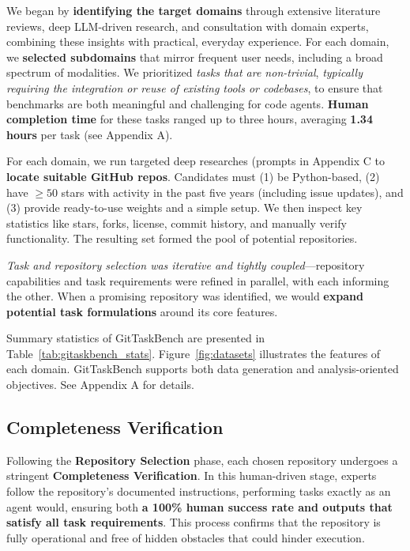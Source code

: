 \documentclass[letterpaper]{article} %
\begin{document}
We began by \textbf{identifying the target domains} through extensive literature reviews, deep LLM-driven research, and consultation with domain experts, combining these insights with practical, everyday experience. For each domain, we \textbf{selected subdomains} that mirror frequent user needs, including a broad spectrum of modalities. 
We prioritized \textit{tasks that are non-trivial}, \textit{typically requiring the integration or reuse of existing tools or codebases}, to ensure that benchmarks are both meaningful and challenging for code agents. 
\textbf{Human completion time} for these tasks ranged up to three hours, averaging \textbf{1.34 hours} per task (see Appendix A).

For each domain, we run targeted deep researches (prompts in Appendix C to \textbf{locate suitable GitHub repos}. Candidates must (1) be Python-based, (2) have $\ge 50$ stars with activity in the past five years (including issue updates), and (3) provide ready-to-use weights and a simple setup. We then inspect key statistics like stars, forks, license, commit history, and manually verify functionality. 
The resulting set formed the pool of potential repositories.

\textit{Task and repository selection was iterative and tightly coupled}—repository capabilities and task requirements were refined in parallel, with each informing the other. When a promising repository was identified, we would \textbf{expand potential task formulations} around its core features. 

Summary statistics of GitTaskBench are presented in Table~\ref{tab:gitaskbench_stats}. 
Figure~\ref{fig:datasets} illustrates the features of each domain.
GitTaskBench supports both data generation and analysis-oriented objectives. 
See Appendix A for details. 

\subsection{Completeness Verification}
Following the \textbf{Repository Selection} phase, each chosen repository undergoes a stringent \textbf{Completeness Verification}. 
In this human-driven stage, experts follow the repository’s documented instructions, performing tasks exactly as an agent would, ensuring both \textbf{a 100\% human success rate and outputs that satisfy all task requirements}. This process confirms that the repository is fully operational and free of hidden obstacles that could hinder execution.
\end{document}
